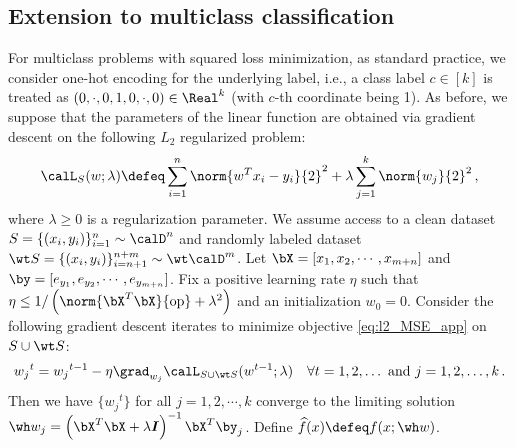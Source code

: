 \subsection{Extension to multiclass classification} \label{app:multiclass_linear}
For multiclass problems with squared loss minimization, as standard practice, we consider one-hot encoding for the underlying label, i.e., a class label $c \in [k]$ is treated as $(0, \cdot, 0,1,0, \cdot, 0) \in \Real^k$ (with $c$-th coordinate being 1).  As before, we suppose that the parameters of the linear function 
are obtained via gradient descent on the following $L_2$ regularized problem: 
\begin{align}
    \calL_S(w; \lambda) \defeq \sum_{i=1}^n\norm{w^Tx_i - y_i}{2}^2 + \lambda \sum_{j=1}^k \norm{w_j}{2}^2 \,, \label{eq:l2_multiclass_MSE_app}   
\end{align}
where $\lambda\ge0$ is a regularization parameter. 
We assume access to a clean dataset 
$S = \{(x_i, y_i)\}_{i=1}^n \sim \calD^n$ 
and randomly labeled dataset 
$\wt S = \{(x_i, y_i)\}_{i=n+1}^{n+m} \sim \wt \calD^m$. 
Let $\bX = [x_1, x_2, \cdots, x_{m+n}]$ 
and $\by = [e_{y_1}, e_{y_2}, \cdots, e_{y_{m+n}}]$. 
Fix a positive learning rate $\eta$ such that 
$\eta \le 1/\left(\norm{\bX^T\bX}{\text{op}} + \lambda^2\right)$ 
and an initialization $w_0 = 0$. 
Consider the following gradient descent iterates 
to minimize objective \eqref{eq:l2_MSE_app} on $S \cup \wt S$:
\begin{align}
{w_j}^t = {w_j}^{t-1} - \eta \grad_{w_j} \calL_{S \cup \wt S} (w^{t-1}; \lambda) \quad \forall t=1,2,\ldots \text{ and } j=1,2,\ldots,k  \,. \label{eq:GD_multi_iterates_app}
\end{align} 
Then we have $\{ {w_j}^t\}$ for all $j =1,2,\cdots, k$ converge to the limiting solution 
$\wh w_j = \left( \bX^T\bX+\lambda \boldsymbol{I}\right)^{-1}\bX^T\by_j$. Define $\widehat f (x) \defeq f(x ; \wh w) $.  

